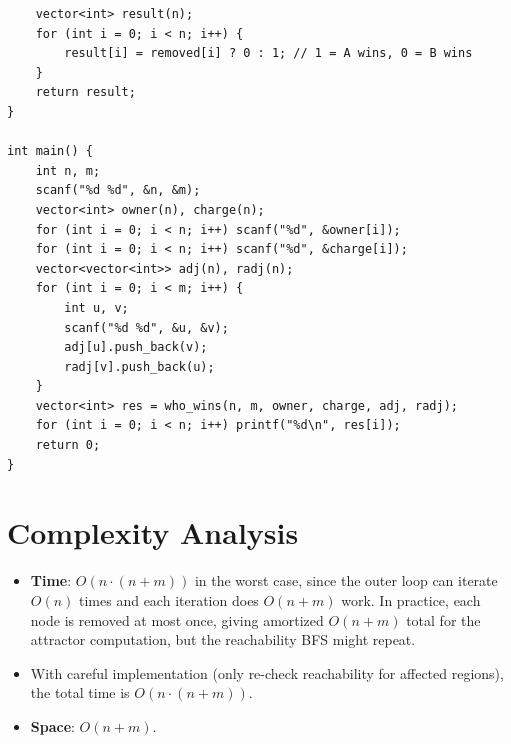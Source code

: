 \documentclass[11pt,a4paper]{article}
\begin{document}
\begin{lstlisting}
    vector<int> result(n);
    for (int i = 0; i < n; i++) {
        result[i] = removed[i] ? 0 : 1; // 1 = A wins, 0 = B wins
    }
    return result;
}

int main() {
    int n, m;
    scanf("%d %d", &n, &m);
    vector<int> owner(n), charge(n);
    for (int i = 0; i < n; i++) scanf("%d", &owner[i]);
    for (int i = 0; i < n; i++) scanf("%d", &charge[i]);
    vector<vector<int>> adj(n), radj(n);
    for (int i = 0; i < m; i++) {
        int u, v;
        scanf("%d %d", &u, &v);
        adj[u].push_back(v);
        radj[v].push_back(u);
    }
    vector<int> res = who_wins(n, m, owner, charge, adj, radj);
    for (int i = 0; i < n; i++) printf("%d\n", res[i]);
    return 0;
}
\end{lstlisting}

\section{Complexity Analysis}

\begin{itemize}
  \item \textbf{Time}: $O(n \cdot (n + m))$ in the worst case, since the outer loop can iterate $O(n)$ times and each iteration does $O(n + m)$ work. In practice, each node is removed at most once, giving amortized $O(n + m)$ total for the attractor computation, but the reachability BFS might repeat.
  \item With careful implementation (only re-check reachability for affected regions), the total time is $O(n \cdot (n + m))$.
  \item \textbf{Space}: $O(n + m)$.
\end{itemize}
\end{document}

